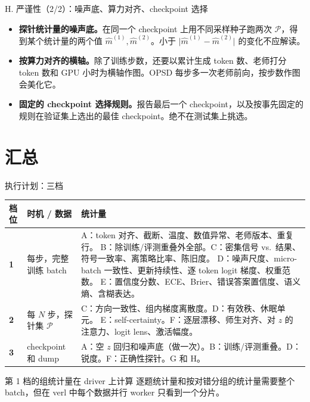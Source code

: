 \documentclass[aspectratio=169,11pt]{beamer}
\newcommand{\abs}[1]{\lvert #1\rvert}
\begin{document}
\begin{frame}{H. 严谨性（2/2）：噪声底、算力对齐、checkpoint 选择}
\begin{itemize}
  \item \textbf{探针统计量的噪声底。}在同一个 checkpoint 上用不同采样种子跑两次 $\mathcal P$，得到某个统计量的两个值 $\hat m^{(1)},\hat m^{(2)}$。小于 $\abs{\hat m^{(1)}-\hat m^{(2)}}$ 的变化不应解读。
  \item \textbf{按算力对齐的横轴。}除了训练步数，还要以累计生成 token 数、老师打分 token 数和 GPU 小时为横轴作图。OPSD 每步多一次老师前向，按步数作图会美化它。
  \item \textbf{固定的 checkpoint 选择规则。}报告最后一个 checkpoint，以及按事先固定的规则在验证集上选出的最佳 checkpoint。绝不在测试集上挑选。
\end{itemize}
\end{frame}

\section{汇总}

\begin{frame}{执行计划：三档}
\scriptsize
\setlength{\tabcolsep}{4pt}\renewcommand{\arraystretch}{1.15}
\begin{tabularx}{\linewidth}{@{}>{\bfseries}l >{\raggedright\arraybackslash}p{2.4cm} Y@{}}
\toprule
档位 & 时机 / 数据 & 统计量\\
 & 每步，完整训练 batch & A：token 对齐、截断、温度、数值异常、老师版本、重复行。
B：除训练/评测重叠外全部。C：密集信号 vs.\ 结果、符号一致率、离策略比率、陈旧度。
D：噪声尺度、micro-batch 一致性、更新持续性、逐 token logit 梯度、权重范数。
E：置信度分数、ECE、Brier、错误答案置信度、语义熵、含糊表达。\\
2 & 每 $N$ 步，探针集 $\mathcal P$ & C：方向一致性、组内梯度离散度。D：有效秩、休眠单元。
E：self-certainty。F：逐层漂移、师生对齐、对 $z$ 的注意力、logit lens、激活幅度。\\
3 & checkpoint 和 dump & A：空 $z$ 回归和噪声底（做一次）。B：训练/评测重叠。D：锐度。F：正确性探针。G 和 H。\\
\bottomrule
\end{tabularx}
\vspace{4pt}
\begin{alertblock}{第 1 档的组统计量在 driver 上计算}
\footnotesize 逐题统计量和按对错分组的统计量需要整个 batch，但在 verl 中每个数据并行 worker 只看到一个分片。
\end{alertblock}
\end{frame}
\end{document}
